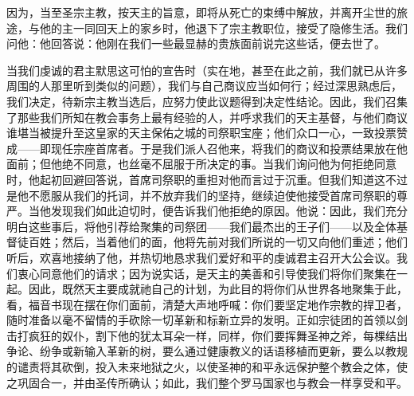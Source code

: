 因为，当至圣宗主教，按天主的旨意，即将从死亡的束缚中解放，并离开尘世的旅途，与他的主一同回天上的家乡时，他退下了宗主教职位，接受了隐修生活。我们问他：他回答说：他刚在我们一些最显赫的贵族面前说完这些话，便去世了。\par

当我们虔诚的君主默思这可怕的宣告时（实在地，甚至在此之前，我们就已从许多周围的人那里听到类似的问题），我们与自己商议应当如何行；经过深思熟虑后，我们决定，待新宗主教当选后，应努力使此议题得到决定性结论。因此，我们召集了那些我们所知在教会事务上最有经验的人，并呼求我们的天主基督，与他们商议谁堪当被提升至这皇家的天主保佑之城的司祭职宝座；他们众口一心，一致投票赞成——即现任宗座首席者。于是我们派人召他来，将我们的商议和投票结果放在他面前；但他绝不同意，也丝毫不屈服于所决定的事。当我们询问他为何拒绝同意时，他起初回避回答说，首席司祭职的重担对他而言过于沉重。但我们知道这不过是他不愿服从我们的托词，并不放弃我们的坚持，继续迫使他接受首席司祭职的尊严。当他发现我们如此迫切时，便告诉我们他拒绝的原因。他说：因此，我们充分明白这些事后，将他引荐给聚集的司祭团——我们最杰出的王子们——以及全体基督徒百姓；然后，当着他们的面，他将先前对我们所说的一切又向他们重述；他们听后，欢喜地接纳了他，并热切地恳求我们爱好和平的虔诚君主召开大公会议。我们衷心同意他们的请求；因为说实话，是天主的美善和引导使我们将你们聚集在一起。因此，既然天主要成就祂自己的计划，为此目的将你们从世界各地聚集于此，看，福音书现在摆在你们面前，清楚大声地呼喊：你们要坚定地作宗教的捍卫者，随时准备以毫不留情的手砍除一切革新和标新立异的发明。正如宗徒团的首领以剑击打疯狂的奴仆，割下他的犹太耳朵一样，同样，你们要挥舞圣神之斧，每棵结出争论、纷争或新输入革新的树，要么通过健康教义的话语移植而更新，要么以教规的谴责将其砍倒，投入未来地狱之火，以使圣神的和平永远保护整个教会之体，使之巩固合一，并由圣传所确认；如此，我们整个罗马国家也与教会一样享受和平。\par

